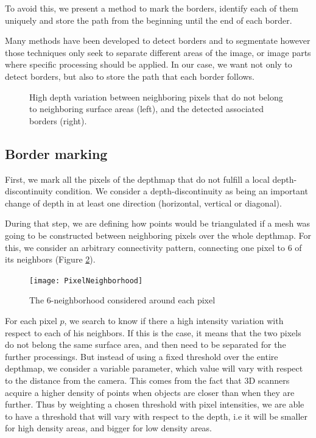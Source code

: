 \documentclass[11pt,fleqn]{book} %
\begin{document}
To avoid this, we present a method to mark the borders, identify each of them uniquely and store the path from the beginning until the end of each border.

Many methods have been developed to detect borders and to segmentate however those techniques only seek to separate different areas of the image, or image parts where specific processing should be applied.
In our case, we want not only to detect borders, but also to store the path that each border follows.

\begin{figure}
\centering
{}
\caption{High depth variation between neighboring pixels that do not belong to neighboring surface areas (left), and the detected associated borders (right).}
\label{fig:depth_discontinuity}
\end{figure}

\subsection{Border marking}
First, we mark all the pixels of the depthmap that do not fulfill a local depth-discontinuity condition. We consider a depth-discontinuity as being an important change of depth in at least one direction (horizontal, vertical or diagonal).

During that step, we are defining how points would be triangulated if a mesh was going to be constructed between neighboring pixels over the whole depthmap. 
For this, we consider an arbitrary connectivity pattern, connecting one pixel to 6 of its neighbors (Figure \ref{fig:pixel_neighborhood}). 

\begin{figure}[ht]
\centering\texttt{[image: PixelNeighborhood]}
\caption{The 6-neighborhood considered around each pixel}
\label{fig:pixel_neighborhood}
\end{figure}

For each pixel $p$, we search to know if there a high intensity variation with respect to each of his neighbors. If this is the case, it means that the two pixels do not belong the same surface area, and then need to be separated for the further processings.
But instead of using a fixed threshold over the entire depthmap, we consider a variable parameter, which value will vary with respect to the distance from the camera.
This comes from the fact that 3D scanners acquire a higher density of points when objects are closer than when they are further. 
Thus by weighting a chosen threshold with pixel intensities, we are able to have a threshold that will vary with respect to the depth, i.e it will be smaller for high density areas, and bigger for low density areas.
\end{document}
